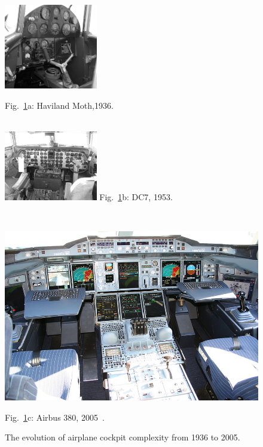 \documentclass[journal]{IEEEtran}
\begin{document}
\begin{figure}[!t]
\begin{minipage}{2in}
\noindent
\includegraphics[width=1.6in]{images/HavilandMoth1936GS}

\noindent
Fig.~\ref{fig:sfig}a: Haviland Moth,1936\cite{deHavilandPhoto}.

~\\


\noindent \includegraphics[width=1.6in]{images/Butler-dc7-N6353C-071102-fox-tanker66-01-16g}
\noindent
Fig.~\ref{fig:sfig}b:  DC7, 1953\cite{DC7photo}.

\end{minipage}~~~~~~\begin{minipage}{6in}


\noindent
  \includegraphics[width=4.8in]{images/800px-Airbus_A380_cockpit}


\noindent
Fig.~\ref{fig:sfig}c:  Airbus 380, 2005~\cite{A380Photo}.
\end{minipage}
\caption{The evolution of airplane cockpit complexity from 1936 to 2005.}\label{fig:sfig}
\end{figure}
\end{document}
